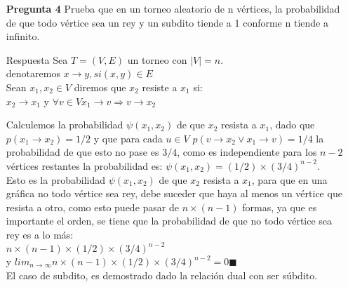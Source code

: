 \documentclass[12pt]{article}
\begin{document}
\lstset{language=python}
\begin{itemize}

\item[\bf{Pregunta 4}] Prueba que en un torneo aleatorio de n vértices, la probabilidad de que todo vértice sea un rey y un subdito tiende a 1 conforme n tiende a infinito.

\item[Respuesta] 
Sea $T=(V,E)$ un torneo con $|V|=n$.\\ 
denotaremos $x \rightarrow  y, si (x,y)\in E$\\

Sean $x_1,x_2 \in V$  diremos que $x_2$ resiste a $x_1 $ si:\\ $x_2 \rightarrow x_1$ y $\forall v \in V x_1 \rightarrow  v \Rightarrow v \rightarrow x_2$

Calculemos la probabilidad $\psi(x_1,x_2)$ de que $x_2$ resista a $x_1$, dado que $p(x_1 \rightarrow x_2)=1/2$ y que para cada $u \in V$  $ p(v\rightarrow x_2 \vee x_1\rightarrow v )=1/4$ la probabilidad de que esto no pase es $3/4$, como es independiente para los $n-2$ vértices restantes la probabilidad es: $\psi(x_1,x_2)=(1/2)\times(3/4)^{n-2}$.\\
Esto es la probabilidad $\psi(x_1,x_2)$ de que $x_2$ resista a $x_1$, para que en una gráfica no todo vértice sea rey, debe suceder que haya al menos un vértice que resista a otro, como esto puede pasar de $n\times(n-1)$ formas, ya que es importante el orden, se tiene que la probabilidad de que no todo vértice sea rey es a lo más:\\
$n\times(n-1)\times(1/2)\times(3/4)^{n-2}$\\

y $lim_{n\to\infty} n\times(n-1)\times(1/2)\times(3/4)^{n-2} = 0 \blacksquare$\\

El caso de subdito, es demostrado dado la relación dual con ser súbdito.
\end{itemize}
\end{document}
